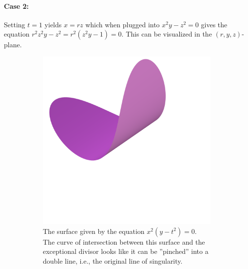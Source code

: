 \documentclass{article}
\begin{document}
\begin{example}
        \paragraph{Case 2:}
        \label{par:case_2_}
        Setting $t = 1$ yields $x = rz$ which when plugged into $x^2y-z^2 = 0$
        gives the equation $r^2z^2y - z^2 = r^2(z^2y - 1) = 0$. This can be
        visualized in the $(r, y, z)$-plane.

        \begin{figure}[h!]
            \centering
            \begin{subfigure}[t]{0.3\textwidth}
                \includegraphics[width=\textwidth]{pictures/line_blowup_affine_1.png}
                \caption{The surface given by the equation $x^2(y - t^2) = 0$. The
                    curve of intersection between this surface and the exceptional
                    divisor looks like it can be ''pinched'' into a double line, i.e., the
                original line of singularity.}
            \end{subfigure}
            ~
            \begin{subfigure}[t]{0.3\textwidth}

\end{subfigure}
\end{figure}
\end{example}
\end{document}
